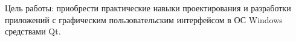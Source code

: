 Цель работы:
приобрести практические навыки проектирования и разработки приложений
с графическим пользовательским интерфейсом в ОС Windows средствами Qt.


